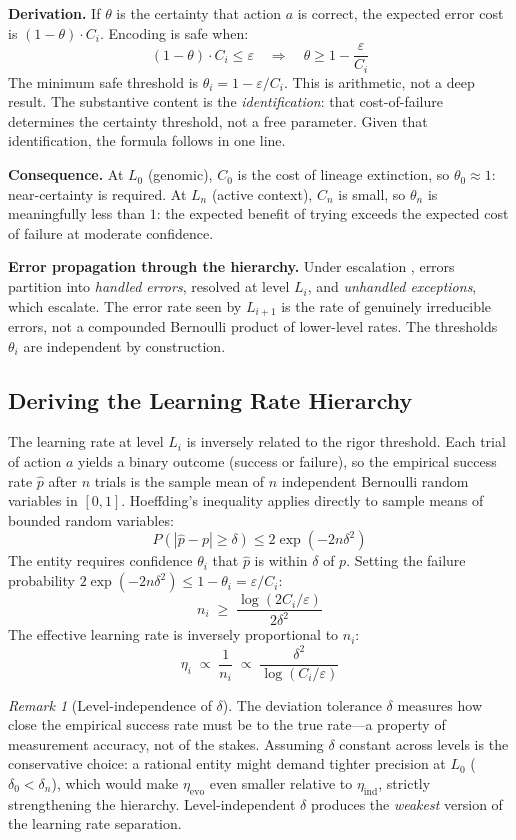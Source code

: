 \documentclass[11pt]{article}
\theoremstyle{definition}
\theoremstyle{remark}
\newtheorem{remark}{Remark}
\begin{document}
\textbf{Derivation.}
If $\theta$ is the certainty that action $a$ is correct, the expected
error cost is $(1 - \theta) \cdot C_i$. Encoding is safe when:
\[
(1 - \theta) \cdot C_i \leq \varepsilon
\quad\Longrightarrow\quad
\theta \geq 1 - \frac{\varepsilon}{C_i}
\]
The minimum safe threshold is $\theta_i = 1 - \varepsilon / C_i$.
This is arithmetic, not a deep result. The substantive content is the
\emph{identification}: that cost-of-failure determines the certainty threshold, not a free parameter. Given that identification,
the formula follows in one line.

\textbf{Consequence.} At $L_0$ (genomic), $C_0$ is the cost of lineage
extinction, so $\theta_0 \approx 1$: near-certainty is required.
At $L_n$ (active context), $C_n$ is small, so $\theta_n$ is
meaningfully less than $1$: the expected benefit of trying exceeds the
expected cost of failure at moderate confidence.

\textbf{Error propagation through the hierarchy.} Under escalation
\cite{McCarthy2026c}, errors partition into \emph{handled errors},
resolved at level $L_i$, and \emph{unhandled exceptions}, which
escalate. The error rate seen by $L_{i+1}$ is the rate of genuinely
irreducible errors, not a compounded Bernoulli product of lower-level
rates. The thresholds $\theta_i$ are independent by construction.

\subsection{Deriving the Learning Rate Hierarchy}

The learning rate at level $L_i$ is inversely related to the rigor
threshold. Each trial of action $a$ yields a binary outcome (success or
failure), so the empirical success rate $\hat{p}$ after $n$ trials is
the sample mean of $n$ independent Bernoulli random variables in
$[0,1]$. Hoeffding's inequality \cite{Hoeffding1963} applies directly
to sample means of bounded random variables:
\[
P(|\hat{p} - p| \geq \delta) \leq 2\exp(-2n\delta^2)
\]
The entity requires confidence $\theta_i$ that $\hat{p}$ is within
$\delta$ of $p$. Setting the failure probability
$2\exp(-2n\delta^2) \leq 1 - \theta_i = \varepsilon / C_i$:
\[
n_i \;\geq\; \frac{\log(2 C_i / \varepsilon)}{2\delta^2}
\]
The effective learning rate is inversely proportional to $n_i$:
\[
\eta_i \;\propto\; \frac{1}{n_i}
\;\propto\; \frac{\delta^2}{\log(C_i / \varepsilon)}
\]

\begin{remark}[Level-independence of $\delta$]
\label{rem:delta}
The deviation tolerance $\delta$ measures how close the empirical
success rate must be to the true rate---a property of measurement
accuracy, not of the stakes. Assuming $\delta$ constant across levels is
the conservative choice: a rational entity might demand tighter
precision at $L_0$ ($\delta_0 < \delta_n$), which would make
$\eta_{\mathrm{evo}}$ even smaller relative to $\eta_{\mathrm{ind}}$,
strictly strengthening the hierarchy. Level-independent $\delta$
produces the \emph{weakest} version of the learning rate separation.
\end{remark}
\end{document}

